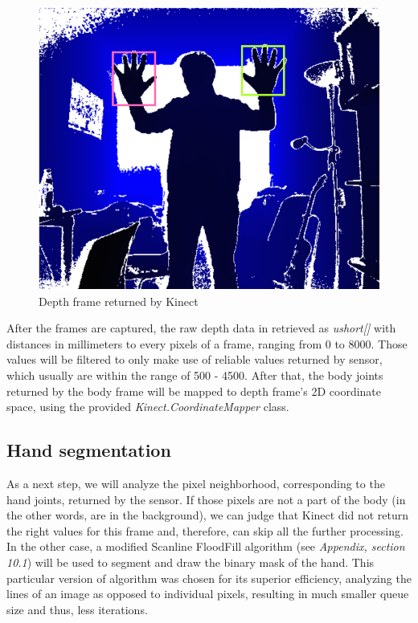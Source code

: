 \documentclass[a4paper,11pt,oneside]{article}
\begin{document}
\begin{figure}[H]
\centering
\includegraphics[scale=0.70]{depth-frame.png}
\caption{Depth frame returned by Kinect}
\end{figure}

After the frames are captured, the raw depth data in retrieved as \textit{ushort[]} with distances in millimeters to every pixels of a frame, ranging from 0 to 8000. Those values will be filtered to only make use of reliable values returned by sensor, which usually are within the range of 500 - 4500. After that, the body joints returned by the body frame will be mapped to depth frame's 2D coordinate space, using the provided \textit{Kinect.CoordinateMapper} class.

\subsection{Hand segmentation}

As a next step, we will analyze the pixel neighborhood, corresponding to the hand joints, returned by the sensor. If those pixels are not a part of the body (in the other words, are in the background), we can judge that Kinect did not return the right values for this frame and, therefore, can skip all the further processing. In the other case, a modified Scanline FloodFill algorithm (see \textit{Appendix, section 10.1}) will be used to segment and draw the binary mask of the hand. This particular version of algorithm was chosen for its superior efficiency, analyzing the lines of an image as opposed to individual pixels, resulting in much smaller queue size and thus, less iterations.
\end{document}
